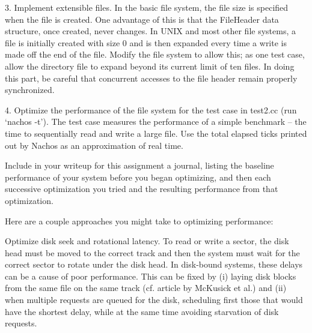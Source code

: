 \begin{description}
\item{3.}
Implement extensible files.  In the basic file system, the file
size is specified when the file is created.  One advantage of this
is that the FileHeader data structure, once created, never changes.
In UNIX and most other file systems, a file is initially created
with size 0 and is then expanded every time a write is made off the
end of the file.  Modify the file system to allow this; as one test
case, allow the directory file to expand beyond its current limit
of ten files.  In doing this part, be careful that concurrent 
accesses to the file header remain properly synchronized.

\item{4.}
Optimize the performance of the file system for the test case in 
test2.cc (run `nachos -t').  The test case measures the performance
of a simple benchmark -- the time to sequentially read and write a large
file.  Use the total elapsed ticks printed out by Nachos as an 
approximation of real time.

Include in your writeup for this assignment a journal, listing the 
baseline performance of your system before you began optimizing, and 
then each successive optimization you tried and the resulting 
performance from that optimization.


Here are a couple approaches you might take to optimizing performance:

\begin{description}

\item Optimize disk seek and rotational latency.  To read or write
a sector, the disk head must be moved to the correct track
and then the system must wait for the correct sector to rotate
under the disk head.  In disk-bound systems, these delays can
be a cause of poor performance.  This can be fixed by (i)
laying disk blocks from the same file on the same track 
(cf. article by McKusick et al.) and (ii)
when multiple requests are queued for the disk, scheduling first
those that would have the shortest delay, while at the same
time avoiding starvation of disk requests.


\end{description}
\end{description}
